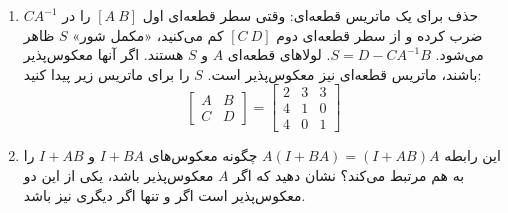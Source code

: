 \documentclass[12pt, a4paper]{book}
\begin{document}
\begin{enumerate}
		\item حذف برای یک ماتریس قطعه‌ای: وقتی سطر قطعه‌ای اول $[A \ B]$ را در $CA^{-1}$ ضرب کرده و از سطر قطعه‌ای دوم $[C \ D]$ کم می‌کنید، «مکمل شور» $S$ ظاهر می‌شود. $S=D-CA^{-1}B$. لولاهای قطعه‌ای $A$ و $S$ هستند. اگر آنها معکوس‌پذیر باشند، ماتریس قطعه‌ای نیز معکوس‌پذیر است. $S$ را برای ماتریس زیر پیدا کنید:
		\[ \begin{bmatrix} A & B \\ C & D \end{bmatrix} = \left[ \begin{array}{c|cc} 2 & 3 & 3 \\ \hline 4 & 1 & 0 \\ 4 & 0 & 1 \end{array} \right] \]
		
		\item این رابطه $A(I + BA) = (I+ AB)A$ چگونه معکوس‌های $I+BA$ و $I+AB$ را به هم مرتبط می‌کند؟ نشان دهید که اگر $A$ معکوس‌پذیر باشد، یکی از این دو معکوس‌پذیر است اگر و تنها اگر دیگری نیز باشد.
	\end{enumerate}
	
\end{document}
